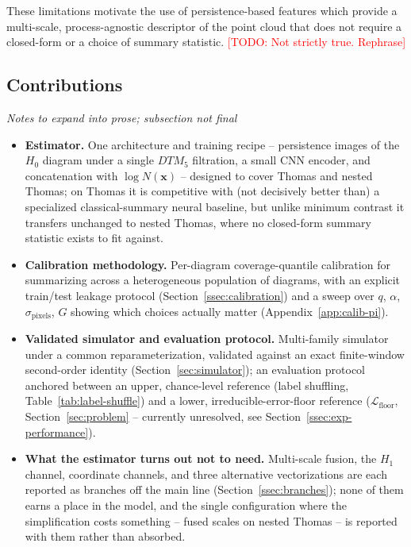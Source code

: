 \documentclass[11pt,letterpaper]{article}
\newcommand{\1}{\mathds{1}}
\newcommand{\pc}{\mathbf{x}}
\newcommand{\todo}[1]{\textcolor{red}{[TODO: #1]}}
\newcommand{\fix}[1]{\textcolor{blue}{[FIX: #1]}}
\newcommand{\todo}[1]{}\newcommand{\fix}[1]{}
\theoremstyle{plain}
\theoremstyle{definitioncolon}
\begin{document}
These limitations motivate the use of persistence-based features which provide a
multi-scale, process-agnostic descriptor of the point cloud that does not require
a closed-form or a choice of summary statistic. \todo{Not strictly true. Rephrase}

\subsection{Contributions}
\label{ssec:contributions}

\emph{Notes to expand into prose; subsection not final}
\begin{itemize}
    \item \textbf{Estimator.} One architecture and training recipe -- persistence
    images of the $H_0$ diagram under a single $DTM_5$ filtration, a small CNN
    encoder, and concatenation with $\log N(\pc)$ -- designed
    to cover Thomas and nested Thomas; on Thomas it is
    competitive with (not decisively better than) a specialized
    classical-summary neural baseline, but unlike minimum contrast it
    transfers unchanged to nested Thomas, where no closed-form summary
    statistic exists to fit against.
    \item \textbf{Calibration methodology.} Per-diagram coverage-quantile
    calibration for summarizing across a heterogeneous population of
    diagrams, with an explicit train/test leakage protocol
    (Section~\ref{ssec:calibration}) and a sweep over $q$, $\alpha$,
    $\sigma_{\text{pixels}}$, $G$ showing which choices actually matter
    (Appendix~\ref{app:calib-pi}).
    \item \textbf{Validated simulator and evaluation protocol.} Multi-family
    simulator under a common
    reparameterization, validated against an exact finite-window second-order
    identity (Section~\ref{sec:simulator}); an evaluation protocol anchored
    between an upper, chance-level reference (label shuffling,
    Table~\ref{tab:label-shuffle}) and a lower, irreducible-error-floor
    reference ($\mathcal{L}_{\text{floor}}$, Section~\ref{sec:problem} --
    currently unresolved, see Section~\ref{ssec:exp-performance}).
    \item \textbf{What the estimator turns out not to need.} Multi-scale
    fusion, the $H_1$ channel, coordinate channels, and three alternative
    vectorizations are each reported as branches off the main line
    (Section~\ref{ssec:branches}); none of them earns a place in the model,
    and the single configuration where the simplification costs something --
    fused scales on nested Thomas -- is reported with them rather than
    absorbed.
\end{itemize}
\end{document}
